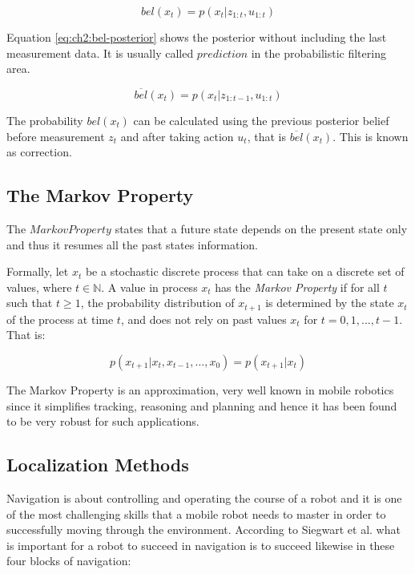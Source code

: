 \begin{equation}
bel(x_t) = p(x_t | z_{1:t}, u_{1:t})
\label{eq:ch2:bel-update}
\end{equation}

Equation \ref{eq:ch2:bel-posterior} shows the posterior without including the last measurement data. It is usually called $prediction$ in the probabilistic filtering area.

\begin{equation}
\overline{bel}(x_t) = p(x_t | z_{1:t-1}, u_{1:t})
\label{eq:ch2:bel-posterior}
\end{equation}

The probability $bel(x_t)$ can be calculated using the previous posterior belief before measurement $z_t$ and after taking action $u_t$, that is $\overline{bel}(x_t)$. This is known as correction\cite{Thrun:robotic-statistics}. 

\subsection{The Markov Property}

The $Markov Property$ states that a future state depends on the present state only and thus it resumes all the past states information.

Formally, let $x_t$ be a stochastic discrete process that can take on a discrete set of values, where $t \in \mathbb{N}$. A value in process $x_t$ has the \textit{Markov Property} if for all $t$ such that $t\geq1$, the probability distribution of $x_{t+1}$ is determined by the state $x_t$ of the process at time $t$, and does not rely on past values $x_t$ for $t = 0, 1, ..., t - 1$\cite{Privault:markov-chains}. That is:

\begin{equation}
p(x_{t+1} | x_t, x_{t-1}, ..., x_0) = p(x_{t+1} | x_t)
\end{equation}

The Markov Property is an approximation, very well known in mobile robotics since it simplifies tracking, reasoning and planning and hence it has been found to be very robust for such applications\cite{Siegwart:intro-autonumous-robots}. 


\subsection{Localization Methods}

Navigation is about controlling and operating the course of a robot and it is one of the most challenging skills that a mobile robot needs to master in order to successfully moving through the environment. According to Siegwart et al. what is important for a robot to succeed in navigation is to succeed likewise in these four blocks of navigation:

